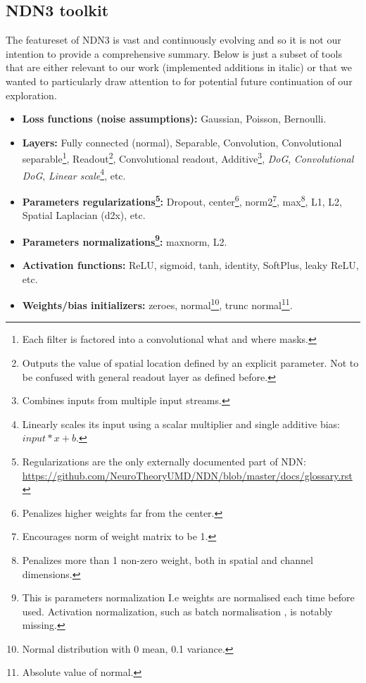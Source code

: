 \subsection{NDN3 toolkit}\label{ch:3.1.1}

The featureset of NDN3 is vast and continuously evolving and so it is not our intention to provide a comprehensive summary. Below is just a subset of tools that are either relevant to our work (implemented additions in italic) or that we wanted to particularly draw attention to for potential future continuation of our exploration.

\begin{itemize}
    \item \textbf{Loss functions (noise assumptions):} Gaussian, Poisson, Bernoulli.
    
    \item \textbf{Layers:} Fully connected (normal), Separable, Convolution, Convolutional separable\footnote{Each filter is factored into a convolutional what and where masks.}, Readout\footnote{Outputs the value of spatial location defined by an explicit parameter. Not to be confused with general readout layer as defined before.}, Convolutional readout, Additive\footnote{Combines inputs from multiple input streams.}, \textit{DoG}, \textit{Convolutional DoG}, \textit{Linear scale}\footnote{Linearly scales its input using a scalar multiplier and single additive bias: $input*x + b$.}, etc.
    
    \item \textbf{Parameters regularizations\footnote{Regularizations are the only externally documented part of NDN: \href{https://github.com/NeuroTheoryUMD/NDN/blob/master/docs/glossary.rst}{https://github.com{\-}/NeuroTheoryUMD/NDN/blob/master/docs/glossary.rst}}:} Dropout, center\footnote{Penalizes higher weights far from the center.}, norm2\footnote{Encourages norm of weight matrix to be 1.}, max\footnote{Penalizes more than 1 non-zero weight, both in spatial and channel dimensions.}, L1, L2, Spatial Laplacian (d2x), etc.
    
    \item \textbf{Parameters normalizations\footnote{This is parameters normalization I.e weights are normalised each time before used. Activation normalization, such as batch normalisation \citep{2015arXiv150203167I}, is notably missing.}:} maxnorm, L2.
    
    \item \textbf{Activation functions:} ReLU, sigmoid, tanh, identity, SoftPlus, leaky ReLU, etc.
    
    \item \textbf{Weights/bias initializers:} zeroes, normal\footnote{Normal distribution with 0 mean, 0.1 variance.}, trunc normal\footnote{Absolute value of normal.}.
\end{itemize}

